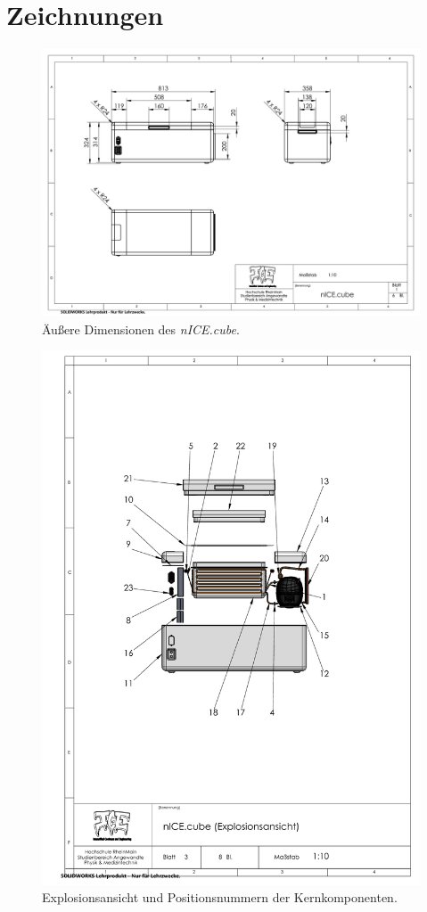\chapter{Zeichnungen}
	\begin{figure}[h]
		\centering
		\includegraphics[angle=90, height=\textheight]{Assembly/aussen_zeichnung.PDF}
		\caption[Äußere Dimensionen]{Äußere Dimensionen des \textit{nICE.cube}.}
		\label{fig:zeichnung aussen}
	\end{figure}
	\clearpage
	\begin{figure}[h]
		\centering
		\includegraphics[height=\textheight]{Assembly/explo_zeichnung.PDF}
		\caption[Explosionsansicht]{Explosionsansicht und Positionsnummern der Kernkomponenten.}
		\label{fig:explo}
	\end{figure}
